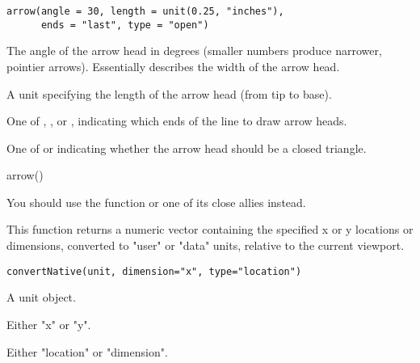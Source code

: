 %
\begin{Usage}
\begin{verbatim}
arrow(angle = 30, length = unit(0.25, "inches"),
      ends = "last", type = "open")
\end{verbatim}
\end{Usage}
%
\begin{Arguments}
\begin{ldescription}
\item[\code{angle}] The angle of the arrow head in degrees (smaller numbers
produce narrower, pointier arrows).  Essentially describes
the width of the arrow head.
\item[\code{length}] A unit specifying the length of the arrow head (from tip
to base).
\item[\code{ends}] One of , , or ,
indicating which ends of the line to draw arrow heads.
\item[\code{type}] One of  or  indicating
whether the arrow head should be a closed triangle.
\end{ldescription}
\end{Arguments}
%
\begin{Examples}
\begin{ExampleCode}
arrow()
\end{ExampleCode}
\end{Examples}
%
\begin{Description}\relax
{}

You should use the  function or one of its
close allies instead.

This function returns a numeric vector containing the specified
x or y locations or dimensions, converted to "user" or "data"
units, relative to the current viewport.
\end{Description}
%
\begin{Usage}
\begin{verbatim}
convertNative(unit, dimension="x", type="location")
\end{verbatim}
\end{Usage}
%
\begin{Arguments}
\begin{ldescription}
\item[\code{unit}]  A unit object. 
\item[\code{dimension}]  Either "x" or "y". 
\item[\code{type}]  Either "location" or "dimension". 
\end{ldescription}
\end{Arguments}
